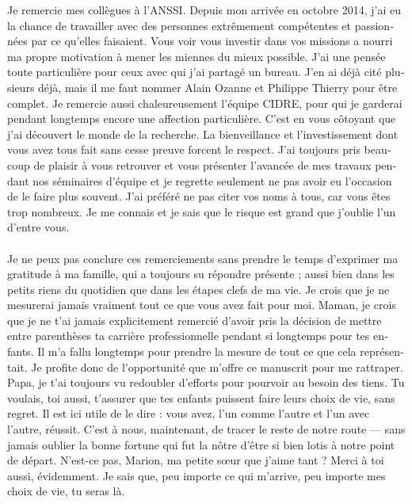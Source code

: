 \begin{otherlanguage}{french}
  Je remercie mes collègues à l’ANSSI. Depuis mon arrivée en octobre 2014, j’ai
  eu la chance de travailler avec des personnes extrêmement compétentes et
  passionnées par ce qu’elles faisaient. Vous voir vous investir dans vos
  missions a nourri ma propre motivation à mener les miennes du mieux
  possible. J’ai une pensée toute particulière pour ceux avec qui j’ai partagé
  un bureau. J’en ai déjà cité plusieurs déjà, mais il me faut nommer Alain
  Ozanne et Philippe Thierry pour être complet.
  Je remercie aussi chaleureusement l’équipe CIDRE, pour qui je garderai pendant
  longtemps encore une affection particulière. C’est en vous côtoyant que j’ai
  découvert le monde de la recherche. La bienveillance et l’investissement dont
  vous avez tous fait sans cesse preuve forcent le respect. J’ai toujours pris
  beaucoup de plaisir à vous retrouver et vous présenter l’avancée de mes
  travaux pendant nos séminaires d’équipe et je regrette seulement ne pas avoir
  eu l’occasion de le faire plus souvent.
  J’ai préféré ne pas citer vos noms à tous, car vous êtes trop nombreux. Je me
  connais et je sais que le risque est grand que j’oublie l’un d’entre vous.

  \paragraph{}
  Je ne peux pas conclure ces remerciements sans prendre le temps d’exprimer ma
  gratitude à ma famille, qui a toujours su répondre présente ; aussi bien dans
  les petits riens du quotidien que dans les étapes clefs de ma vie. Je crois
  que je ne mesurerai jamais vraiment tout ce que vous avez fait pour
  moi. Maman, je crois que je ne t’ai jamais explicitement remercié d’avoir pris
  la décision de mettre entre parenthèses ta carrière professionnelle pendant si
  longtemps pour tes enfants. Il m’a fallu longtemps pour prendre la mesure de
  tout ce que cela représentait. Je profite donc de l’opportunité que m’offre ce
  manuscrit pour me rattraper. Papa, je t’ai toujours vu redoubler d’efforts
  pour pourvoir au besoin des tiens. Tu voulais, toi aussi, t’assurer que tes
  enfants puissent faire leurs choix de vie, sans regret. Il est ici utile de le
  dire : vous avez, l’un comme l’autre et l’un avec l’autre, réussit. C’est à
  nous, maintenant, de tracer le reste de notre route --- sans jamais oublier la
  bonne fortune qui fut la nôtre d’être si bien lotis à notre point de départ.
  N’est-ce pas, Marion, ma petite sœur que j’aime tant ? Merci à toi aussi,
  évidemment. Je sais que, peu importe ce qui m’arrive, peu importe mes choix de
  vie, tu seras là.
\end{otherlanguage}

